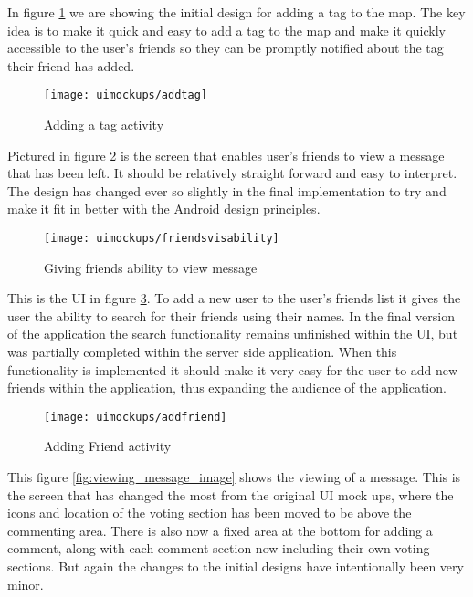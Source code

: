 \noindent
In figure \ref{fig:add_tag_activity_image} we are showing the initial design for adding a tag to the map. The key idea is to make it quick and easy to add a tag to the map and make it quickly accessible to the user's friends so they can be promptly notified about the tag their friend has added.\\

\begin{figure}[H]
    \centering
    \texttt{[image: uimockups/addtag]}
    \caption{Adding a tag activity}
    \label{fig:add_tag_activity_image}
\end{figure}

\noindent
Pictured in figure \ref{fig:giving_friends_visability_image} is the screen that enables user's friends to view a message that has been left. It should be relatively straight forward and easy to interpret. The design has changed ever so slightly in the final implementation to try and make it fit in better with the Android design principles.\\

\begin{figure}[H]
    \centering
    \texttt{[image: uimockups/friendsvisability]}
    \caption{Giving friends ability to view message}
    \label{fig:giving_friends_visability_image}
\end{figure} 

\noindent
This is the UI in figure \ref{fig:add_friend_activity_image}. To add a new user to the user's friends list it gives the user the ability to search for their friends using their names. In the final version of the application the search functionality remains unfinished within the UI, but was partially completed within the server side application. When this functionality is implemented it should make it very easy for the user to add new friends within the application, thus expanding the audience of the application.\\

\begin{figure}[H]
    \centering
    \texttt{[image: uimockups/addfriend]}
    \caption{Adding Friend activity}
    \label{fig:add_friend_activity_image}
\end{figure} 

\noindent
This figure \ref{fig:viewing_message_image} shows the viewing of a message. This is the screen that has changed the most from the original UI mock ups, where the icons and location of the voting section has been moved to be above the commenting area. There is also now a fixed area at the bottom for adding a comment, along with each comment section now including their own voting sections. But again the changes to the initial designs have intentionally been very minor.\\

